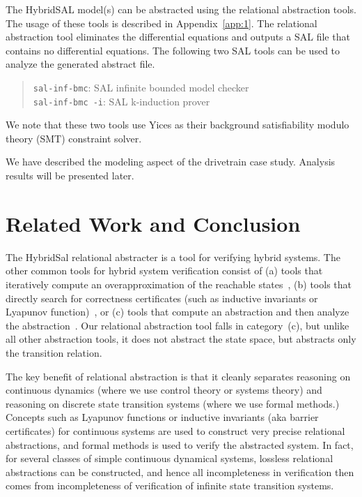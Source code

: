 \documentclass{llncs}
\begin{document}
The HybridSAL model(s) can be abstracted using the relational abstraction tools.
The usage of these tools is described in Appendix~\ref{app:1}.
The relational abstraction tool eliminates the differential equations and outputs
a SAL file that contains no differential equations.  The following two
SAL tools can be used to analyze the generated abstract file.
\begin{quote}
 {\tt{sal-inf-bmc}}: SAL infinite bounded model checker
\\
 {\tt{sal-inf-bmc -i}}:  SAL k-induction prover
\end{quote}
We note that these two tools use Yices as their background 
satisfiability modulo theory (SMT) constraint solver.

We have described the modeling aspect of the drivetrain case study.
Analysis results will be presented later.

\section{Related Work and Conclusion}

The HybridSal relational abstracter is a tool for verifying
hybrid systems.  The other common tools for hybrid
system verification consist of 
(a) tools that iteratively compute
an overapproximation of the reachable states~\cite{SpaceExsmall},
(b) tools that directly search for correctness certificates
(such as inductive invariants or Lyapunov function)~\cite{sostools,ST11:ISSACsmall},
or
(c) tools that compute an abstraction and then analyze
the abstraction~\cite{HybridSALsmall,AlurDangIvancic03:TACASsmall,Clarke03:TACASsmall}.
Our relational abstraction tool falls in category~(c), but unlike all
other abstraction tools, it does
not abstract the state space, but abstracts only the transition relation.
 
The key benefit of relational abstraction
is that it cleanly separates reasoning on continuous
dynamics (where we use control theory or systems theory)
and
reasoning on discrete state transition systems (where we use 
formal methods.)
Concepts such as Lyapunov functions or inductive invariants
(aka barrier certificates) for continuous systems are used
to construct very precise relational abstractions, and
formal methods is used to verify the abstracted system.
In fact, for several classes of simple continuous dynamical systems, 
lossless relational abstractions can be constructed, and hence
all incompleteness in verification then comes from incompleteness
of verification of infinite state transition systems. %
\end{document}
